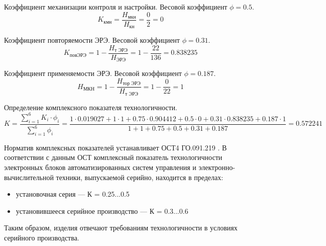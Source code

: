 \documentclass{article}
\begin{document}
Коэффициент механизации контроля и настройки.
Весовой коэффициент $\phi = 0.5$.
$$
K_\text{кмн}
    = \frac{H_\text{мкн}}
           {H_\text{кн}}
    = \frac{0}{2}
    = 0
$$

Коэффициент повторяемости ЭРЭ.
Весовой коэффициент $\phi = 0.31$.
$$
K_\text{повЭРЭ}
    = 1 - \frac{H_\text{т ЭРЭ}}
               {H_\text{ЭРЭ}}
    = 1 - \frac{22}{136}
    = 0.838235
$$

Коэффициент применяемости ЭРЭ.
Весовой коэффициент $\phi = 0.187$.
$$
H_{\text{МКН}}
    = 1 - \frac{H_\text{тор ЭРЭ}}
               {H_\text{т ЭРЭ}}
    = 1 - \frac{0}{22}
    = 1
$$

Определение комплексного показателя технологичности.
$$
K   = \frac{\sum_{i=1}^6 K_i \cdot \phi_i }
         {\sum_{i=1}^6 \phi_i }
    = \frac{ 1 \cdot 0.019027
             + 1 \cdot 1
             + 0.75 \cdot 0.904412
             + 0.5 \cdot 0
             + 0.31 \cdot 0.838235
             + 0.187 \cdot 1 }
           { 1
             + 1
             + 0.75
             + 0.5
             + 0.31
             + 0.187 }
    = 0.572241
$$

Норматив комплексных показателей устанавливает ОСТ4 ГО.091.219 \cite{OST4_GO_010_011}.
В соответствии с данным ОСТ комплексный показатель технологичности электронных
блоков автоматизированных систем управления и электронно-вычислительной техники,
выпускаемой серийно, находится в пределах:

\begin{itemize}
    \item установочная серия --- К = 0.25...0.5
    \item установившееся серийное производство --- К = 0.3...0.6
\end{itemize}

Таким образом, изделия отвечают требованиям технологичности в условиях
серийного производства.

\newpage
\section[Список использованной литературы]{}
\begin{thebibliography}{30}
    
\end{thebibliography}
\end{document}

